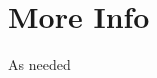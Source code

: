 \documentclass[a4paper,11pt]{article} \pdfoutput=1
\begin{document}
\appendix
\section{More Info}
As needed










\end{document}
